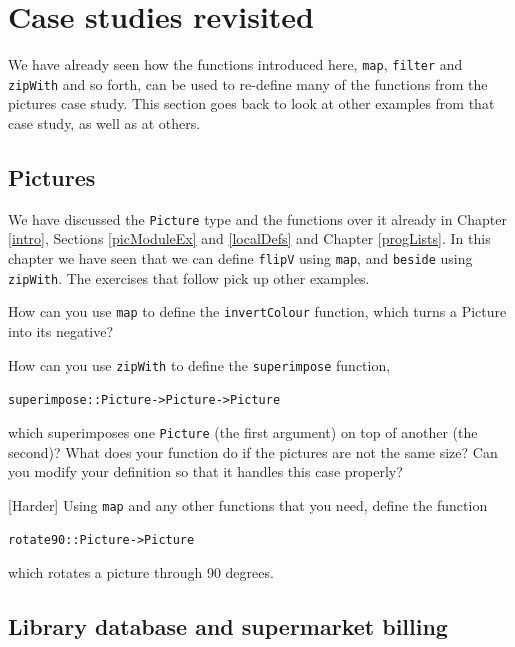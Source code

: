 \section{Case studies revisited}

We have already seen how the functions introduced here, \texttt{map}, \texttt{filter} and \texttt{zipWith} and so forth, can be used to re-define many of the functions from the pictures case study. This section goes back to look at other examples from that case study, as well as at others.

\subsection*{Pictures}

We have discussed the \texttt{Picture} type and the functions over it already in Chapter \ref{intro}, Sections \ref{picModuleEx} and \ref{localDefs} and Chapter \ref{progLists}. In this chapter we have seen that we can define \texttt{flipV} using \texttt{map}, and \texttt{beside} using \texttt{zipWith}. The exercises that follow pick up other examples.

\begin{exercises}

\item
How can you use \texttt{map} to define the \texttt{invertColour} function, which turns a Picture into its negative?

\item
How can you use \texttt{zipWith} to define the \texttt{superimpose} function, 
\begin{alltt}
superimpose :: Picture -> Picture -> Picture
\end{alltt}
which superimposes one \texttt{Picture} (the first argument) on top of another (the second)? What does your function do if the pictures are not the same size? Can you modify your definition so that it handles this case properly?

\item {[Harder]}
Using \texttt{map} and any other functions that you need, define the function
\begin{alltt}
rotate90 :: Picture -> Picture
\end{alltt}
which rotates a picture through 90 degrees. 



\end{exercises}

\subsection*{Library database and supermarket billing}

